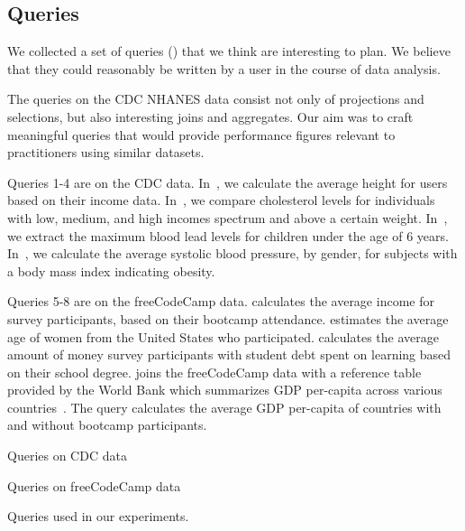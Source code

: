 \subsection{Queries}
We collected a set of queries () that we think are interesting to plan.
We believe that they could reasonably be written by a user in the course of data analysis.

The queries on the CDC NHANES data consist not only of projections and selections, but also interesting joins and aggregates.
Our aim was to craft meaningful queries
that would provide performance figures relevant to practitioners using
similar datasets.

Queries 1-4 are on the CDC data. In~, we calculate the average height for
users based on their income data. In~, we compare cholesterol levels for
individuals with low, medium, and high incomes spectrum and above a certain weight. In~, 
we extract the maximum blood lead levels for children under the age of 6
years. In~, we calculate the average systolic blood pressure, by gender, for
subjects with a body mass index indicating obesity. 

Queries 5-8 are on the freeCodeCamp data.
 calculates the average income for survey participants, based on their bootcamp attendance.
 estimates the average age of women from the United States who participated.
 calculates the average amount of money survey participants with student debt spent on learning based on their school degree.
 joins the freeCodeCamp data with a reference table provided by the World Bank which summarizes GDP per-capita across various countries~\cite{worldbank-data}.
The query calculates the average GDP per-capita of countries with and without bootcamp participants. 

\begin{table}
  \centering
  \begin{subtable}{\linewidth}
    
    \caption{Queries on CDC data}\label{fig:queries-cdc}
  \end{subtable}
  \par\medskip
  \begin{subtable}{\linewidth}
    
    \caption{Queries on freeCodeCamp data}\label{fig:queries-fcc}
  \end{subtable}
  \par\medskip  
  \caption{Queries used in our experiments.}\label{fig:queries}
\end{table}

